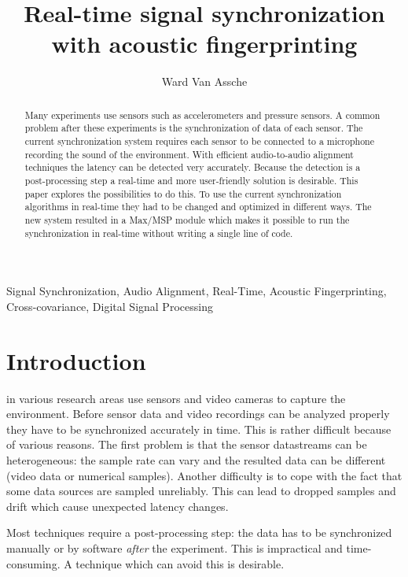 \documentclass[twocolumn]{phdsymp} %
\begin{document}
\title{Real-time signal synchronization with acoustic fingerprinting} %

\author{Ward Van Assche}


\maketitle

\begin{abstract}
Many experiments use sensors such as accelerometers and pressure sensors. A common problem after these experiments is the synchronization of data of each sensor. The current synchronization system requires each sensor to be connected to a microphone recording the sound of the environment. With efficient audio-to-audio alignment techniques the latency can be detected very accurately. Because the detection is a post-processing step a real-time and more user-friendly solution is desirable. This paper explores the possibilities to do this. To use the current synchronization algorithms in real-time they had to be changed and optimized in different ways. The new system resulted in a Max/MSP module which makes it possible to run the synchronization in real-time without writing a single line of code.
\end{abstract}

\begin{keywords}
Signal Synchronization, Audio Alignment, Real-Time, Acoustic Fingerprinting, Cross-covariance, Digital Signal Processing
\end{keywords}

\section{Introduction}


 in various research areas use sensors and video cameras to capture the environment.  Before sensor data and video recordings can be analyzed properly they have to be synchronized accurately in time. This is rather difficult because of various reasons. The first problem is that the sensor datastreams can be heterogeneous: the sample rate can vary and the resulted data can be different (video data or numerical samples). Another difficulty is to cope with the fact that some data sources are sampled unreliably. This can lead to dropped samples and drift which cause unexpected latency changes. 

Most techniques require a post-processing step: the data has to be synchronized manually or by software \emph{after} the experiment. This is impractical and time-consuming. A technique which can avoid this is desirable.
\end{document}
